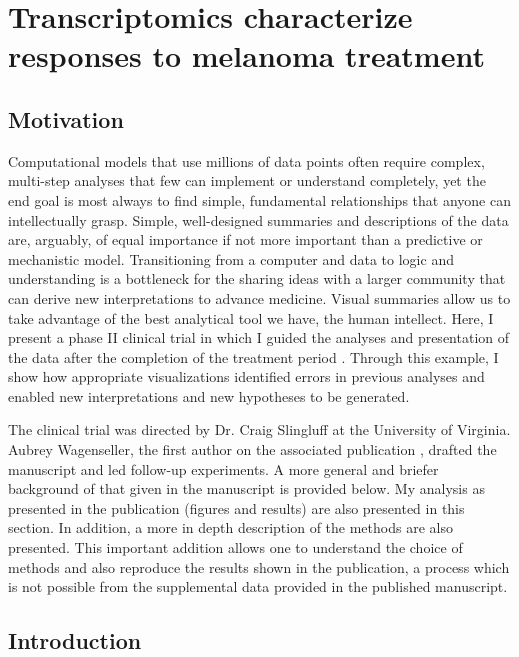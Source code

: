 
\chapter[miRNA Transcriptomics of melanoma]
{ Transcriptomics characterize responses to melanoma treatment }\label{chapter:jtm}

\section{Motivation}

Computational models that use millions of data points
often require complex, multi-step analyses that few can implement or understand completely, 
yet the end goal is most always 
to find simple, fundamental relationships
that anyone can intellectually grasp. Simple, well-designed
summaries and descriptions of the data are, arguably, of equal importance if not
more important than a predictive or mechanistic model.
Transitioning from a computer and data to logic and understanding is a
bottleneck for the sharing ideas with a larger community
that can derive new interpretations to advance medicine.
Visual summaries allow us to take advantage of the best
analytical tool we have, the human intellect.
Here, I present a phase II
clinical trial in which I guided the analyses and presentation of the data
after the completion of the treatment period \cite{Wagenseller:2013fj}.
Through this example, I show how appropriate visualizations identified
errors in previous analyses and enabled new interpretations and new
hypotheses to be generated.

The clinical trial was directed by Dr. Craig Slingluff at the
University of Virginia. Aubrey Wagenseller, the first author on the associated
publication \cite{Wagenseller:2013fj}, drafted the manuscript 
and led follow-up experiments. A more general and briefer background
of that given in the manuscript is provided below. My analysis as presented
in the publication (figures and results) are also presented in this section. 
In addition, a more in depth description of the
methods are also presented. This important addition allows one to understand
the choice of methods and also reproduce
the results shown in the publication, a process which is not possible from the
supplemental data provided in the published manuscript.

\section{Introduction}

